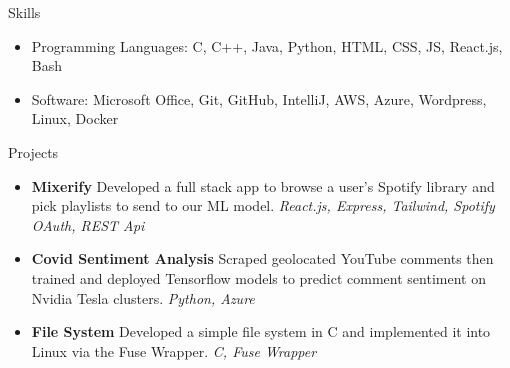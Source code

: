 \documentclass[]{mcdowellcv}
\begin{document}
\begin{cvsection}{Skills}
	\begin{cvsubsection}{}{}{}
		\begin{itemize}
			\item Programming Languages:  C, C++, Java, Python, HTML, CSS, JS, React.js, Bash
			\item Software:  Microsoft Office, Git, GitHub, IntelliJ, AWS, Azure, Wordpress, Linux, Docker
		\end{itemize}
	\end{cvsubsection}
\end{cvsection}
\begin{cvsection}{Projects}
	\begin{cvsubsection}{}{}{}
		\begin{itemize}
			\setlength\itemsep{3pt}
			\item \textbf{Mixerify} Developed a full stack app to browse a user's Spotify library and pick playlists to send to our ML model. \textit{React.js, Express, Tailwind, Spotify OAuth, REST Api}
			\item \textbf{Covid Sentiment Analysis}  Scraped geolocated YouTube comments then trained and deployed Tensorflow models to predict comment sentiment on Nvidia Tesla clusters. \textit{Python, Azure}
			\item \textbf{File System}  Developed a simple file system in C and implemented it into Linux via the Fuse Wrapper. \textit{C, Fuse Wrapper}
		\end{itemize}
	\end{cvsubsection}
\end{cvsection}
\end{document}
